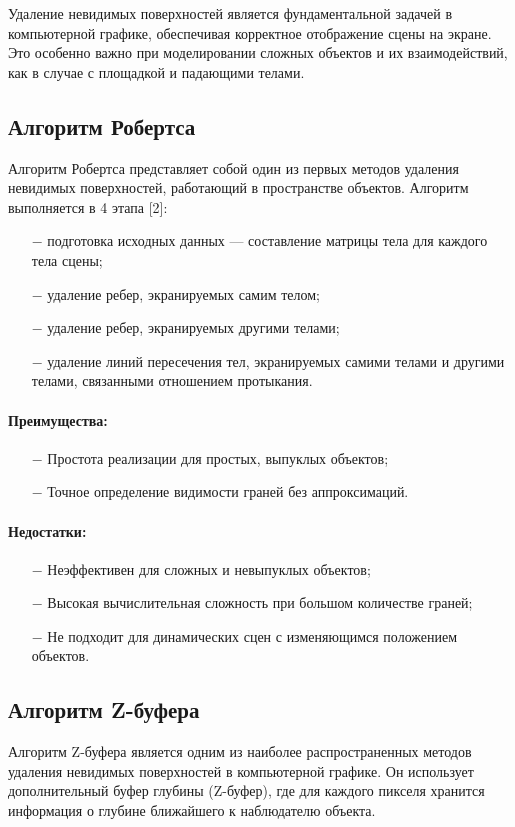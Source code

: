 Удаление невидимых поверхностей является фундаментальной задачей в компьютерной графике, обеспечивая корректное отображение сцены на экране. Это особенно важно при моделировании сложных объектов и их взаимодействий, как в случае с площадкой и падающими телами.

\subsection{Алгоритм Робертса}

Алгоритм Робертса представляет собой один из первых методов удаления невидимых поверхностей, работающий в пространстве объектов. Алгоритм выполняется в 4 этапа [2]:
\begin{itemize}
	\item[$-$] подготовка исходных данных — составление матрицы тела для каждого тела сцены;
    \item[$-$] удаление ребер, экранируемых самим телом;
    \item[$-$] удаление ребер, экранируемых другими телами;
    \item[$-$] удаление линий пересечения тел, экранируемых самими телами и другими телами, связанными отношением протыкания.
\end{itemize}
\paragraph{Преимущества:}
\begin{itemize}
	\item[$-$] Простота реализации для простых, выпуклых объектов;
    \item[$-$] Точное определение видимости граней без аппроксимаций.
\end{itemize}
\paragraph{Недостатки:}
\begin{itemize}
	\item[$-$] Неэффективен для сложных и невыпуклых объектов;
    \item[$-$] Высокая вычислительная сложность при большом количестве граней;
    \item[$-$] Не подходит для динамических сцен с изменяющимся положением объектов.
\end{itemize}

\subsection{Алгоритм Z-буфера}
Алгоритм Z-буфера является одним из наиболее распространенных методов удаления невидимых поверхностей в компьютерной графике. Он использует дополнительный буфер глубины (Z-буфер), где для каждого пикселя хранится информация о глубине ближайшего к наблюдателю объекта.

